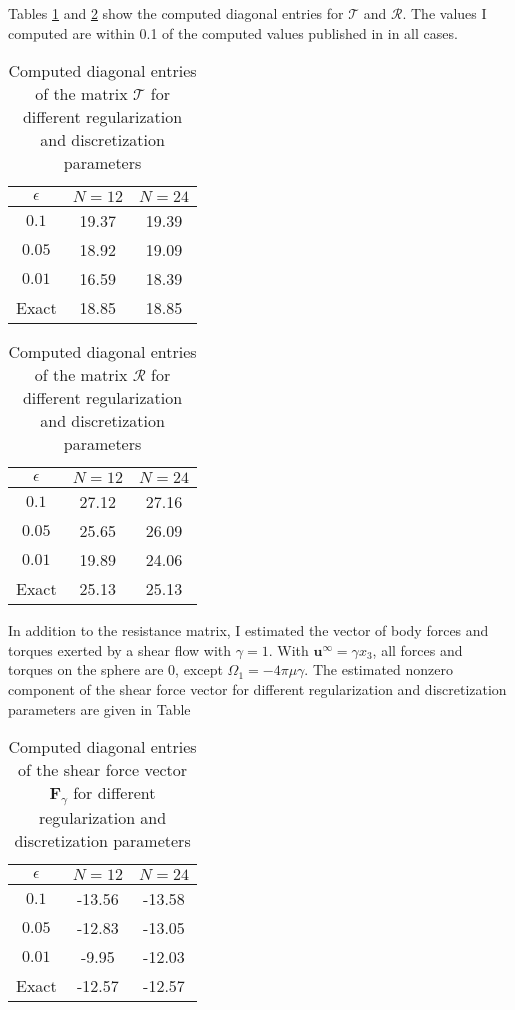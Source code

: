 \documentclass{article}
\begin{document}
Tables \ref{tab:t-matrix} and \ref{tab:r-matrix} show the computed
diagonal entries for $\mathcal{T}$ and $\mathcal{R}$. The values I
computed are within 0.1 of the computed values published in
\cite{Cortez2005} in all cases.

\begin{table}
  \centering
  \begin{tabular}{ccc}
    $\epsilon$ & $N = 12$ & $N = 24$ \\ \hline
    $0.1$ & 19.37 & 19.39 \\
    $0.05$ & 18.92 & 19.09 \\
    $0.01$ & 16.59 & 18.39 \\
    Exact & 18.85 & 18.85 \\ \hline
  \end{tabular}
  \caption{Computed diagonal entries of the matrix $\mathcal{T}$ for
    different regularization and discretization parameters}
  \label{tab:t-matrix}
\end{table}

\begin{table}
  \centering
  \begin{tabular}{ccc}
    $\epsilon$ & $N = 12$ & $N = 24$ \\ \hline
    $0.1$ & 27.12 & 27.16 \\
    $0.05$ & 25.65 & 26.09 \\
    $0.01$ & 19.89 & 24.06 \\
    Exact & 25.13 & 25.13 \\ \hline
  \end{tabular}
  \caption{Computed diagonal entries of the matrix $\mathcal{R}$ for
    different regularization and discretization parameters}
  \label{tab:r-matrix}
\end{table}

In addition to the resistance matrix, I estimated the vector of body
forces and torques exerted by a shear flow with $\gamma =
1$. With $\mathbf{u}^\infty = \gamma x_3$, all forces and torques on the
sphere are 0, except $\Omega_1 = -4 \pi \mu \gamma$. The estimated
nonzero component of the shear force vector for different
regularization and discretization parameters are given in Table

\begin{table}
  \centering
  \begin{tabular}{ccc}
    $\epsilon$ & $N = 12$ & $N = 24$ \\ \hline
    $0.1$ & -13.56 & -13.58 \\
    $0.05$ & -12.83 & -13.05 \\
    $0.01$ & -9.95 & -12.03 \\
    Exact & -12.57 & -12.57 \\ \hline
  \end{tabular}
  \caption{Computed diagonal entries of the shear force vector
    $\mathbf{F}_\gamma$ for different regularization and
    discretization parameters}
  \label{tab:s-vector}
\end{table}



\end{document}

